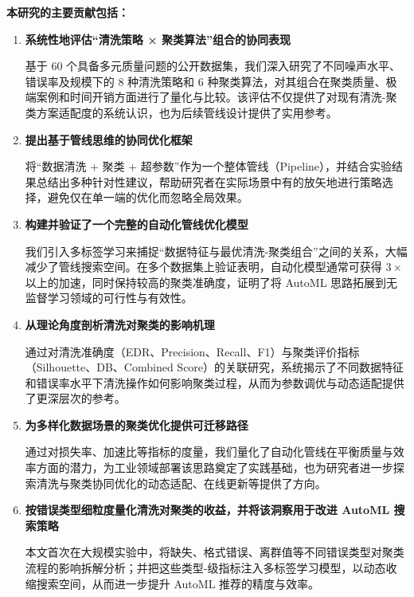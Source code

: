 \documentclass[10pt]{article} %
\numberwithin{equation}{section}
\begin{document}
\textbf{本研究的主要贡献包括：}
\begin{enumerate}
    \item \textbf{系统性地评估“清洗策略 × 聚类算法”组合的协同表现}

    基于 60 个具备多元质量问题的公开数据集，我们深入研究了不同噪声水平、错误率及规模下的 8 种清洗策略和 6 种聚类算法，对其组合在聚类质量、极端案例和时间开销方面进行了量化与比较。该评估不仅提供了对现有清洗-聚类方案适配度的系统认识，也为后续管线设计提供了实用参考。

    \item \textbf{提出基于管线思维的协同优化框架}

    将“数据清洗 + 聚类 + 超参数”作为一个整体管线（Pipeline），并结合实验结果总结出多种针对性建议，帮助研究者在实际场景中有的放矢地进行策略选择，避免仅在单一端的优化而忽略全局效果。

    \item \textbf{构建并验证了一个完整的自动化管线优化模型}

    我们引入多标签学习来捕捉“数据特征与最优清洗-聚类组合”之间的关系，大幅减少了管线搜索空间。在多个数据集上验证表明，自动化模型通常可获得 $3\times$ 以上的加速，同时保持较高的聚类准确度，证明了将 AutoML 思路拓展到无监督学习领域的可行性与有效性。

    \item \textbf{从理论角度剖析清洗对聚类的影响机理}

    通过对清洗准确度（EDR、Precision、Recall、F1）与聚类评价指标（Silhouette、DB、Combined Score）的关联研究，系统揭示了不同数据特征和错误率水平下清洗操作如何影响聚类过程，从而为参数调优与动态适配提供了更深层次的参考。

    \item \textbf{为多样化数据场景的聚类优化提供可迁移路径}

    通过对损失率、加速比等指标的度量，我们量化了自动化管线在平衡质量与效率方面的潜力，为工业领域部署该思路奠定了实践基础，也为研究者进一步探索清洗与聚类协同优化的动态适配、在线更新等提供了方向。

    \item \textbf{\textcolor[rgb]{0.00,0.07,1.00}{按错误类型细粒度量化清洗对聚类的收益，并将该洞察用于改进 AutoML 搜索策略}}

    \textcolor[rgb]{0.00,0.07,1.00}{本文首次在大规模实验中，将缺失、格式错误、离群值等不同错误类型对聚类流程的影响拆解分析；并把这些类型-级指标注入多标签学习模型，以动态收缩搜索空间，从而进一步提升 AutoML 推荐的精度与效率。}
\end{enumerate}
\end{document}
